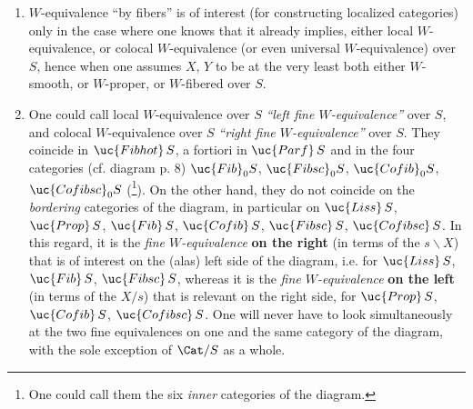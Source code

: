 \begin{enumerate}[leftmargin=*]
\item[1)] $W$-equivalence ``by fibers'' is of interest (for constructing localized categories) only in the case where one knows that it already implies, either local $W$-equivalence, or colocal $W$-equivalence (or even universal $W$-equivalence) over $S$, hence when one assumes $X$, $Y$ to be at the very least both either $W$-smooth, or $W$-proper, or $W$-fibered over $S$.

\item[2)] One could call local $W$-equivalence over $S$ \textit{``left fine $W$-equivalence''} over $S$, and colocal $W$-equivalence over $S$ \textit{``right fine $W$-equivalence''} over $S$. They coincide in $\uc{Fibhot}\,S$, a fortiori in $\uc{Parf}\,S$ and in the four categories (cf. diagram p. 8) $\uc{Fib}_0S$, $\uc{Fibsc}_0S$, $\uc{Cofib}_0S$, $\uc{Cofibsc}_0S$ (\footnote[33]{One could call them the six \textit{inner} categories of the diagram.}). On the other hand, they do not coincide on the \textit{bordering} categories of the diagram, in particular on $\uc{Liss}\,S$, $\uc{Prop}\,S$, $\uc{Fib}\,S$, $\uc{Cofib}\,S$, $\uc{Fibsc}\,S$, $\uc{Cofibsc}\,S$. In this regard, it is the \textit{fine $W$-equivalence} \textbf{on the right} (in terms of the $s\backslash X$) that is of interest on the (alas) left side of the diagram, i.e. for $\uc{Liss}\,S$, $\uc{Fib}\,S$, $\uc{Fibsc}\,S$, whereas it is the \textit{fine $W$-equivalence} \textbf{on the left} (in terms of the $X/s$) that is relevant on the right side, for $\uc{Prop}\,S$, $\uc{Cofib}\,S$, $\uc{Cofibsc}\,S$. One will never have to look simultaneously at the two fine equivalences on one and the same category of the diagram, with the sole exception of $\Cat/S$ as a whole.
\end{enumerate}


